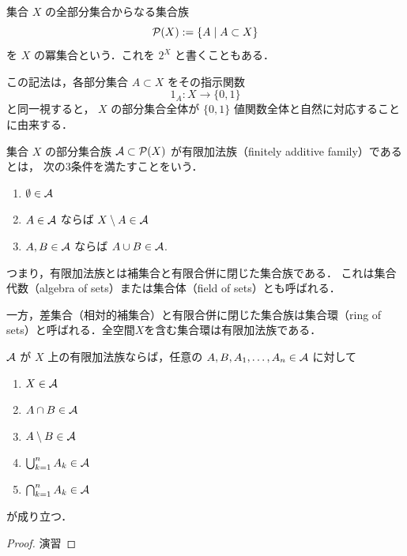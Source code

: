 \begin{definition}[冪集合]
集合 $X$ の全部分集合からなる集合族
\[
\mathcal P(X):=\{A \mid A \subset X\}
\]
を $X$ の冪集合という．これを $2^X$ と書くこともある．

この記法は，各部分集合 $A \subset X$ をその指示関数
\[
1_A : X \to \{0,1\}
\]
と同一視すると，
$X$ の部分集合全体が $\{0,1\}$ 値関数全体と自然に対応することに由来する．
\end{definition}

\begin{definition}[有限加法族]
集合 $X$ の部分集合族 $\mathcal A \subset \mathcal P(X)$ が有限加法族（finitely additive family）であるとは，
次の3条件を満たすことをいう．
\begin{enumerate}
    \item $\emptyset \in \mathcal A$
    \item $A \in \mathcal A$ ならば $X \setminus A \in \mathcal A$
    \item $A,B \in \mathcal A$ ならば $A \cup B \in \mathcal A$.
\end{enumerate}
\end{definition}

\begin{remark}
つまり，有限加法族とは補集合と有限合併に閉じた集合族である．
これは集合代数（algebra of sets）または集合体（field of sets）とも呼ばれる．

一方，差集合（相対的補集合）と有限合併に閉じた集合族は集合環（ring of sets）と呼ばれる．全空間$X$を含む集合環は有限加法族である．
\end{remark}


\begin{proposition}[有限加法族の基本性質]
$\mathcal A$ が $X$ 上の有限加法族ならば，任意の $A,B,A_1,\dots,A_n \in \mathcal A$ に対して
\begin{enumerate}
    \item $X \in \mathcal A$
    \item $A \cap B \in \mathcal A$
    \item $A \setminus B \in \mathcal A$
    \item $\bigcup_{k=1}^n A_k \in \mathcal A$
    \item $\bigcap_{k=1}^n A_k \in \mathcal A$
\end{enumerate}
が成り立つ．
\end{proposition}
\begin{proof}
    演習
\end{proof}

